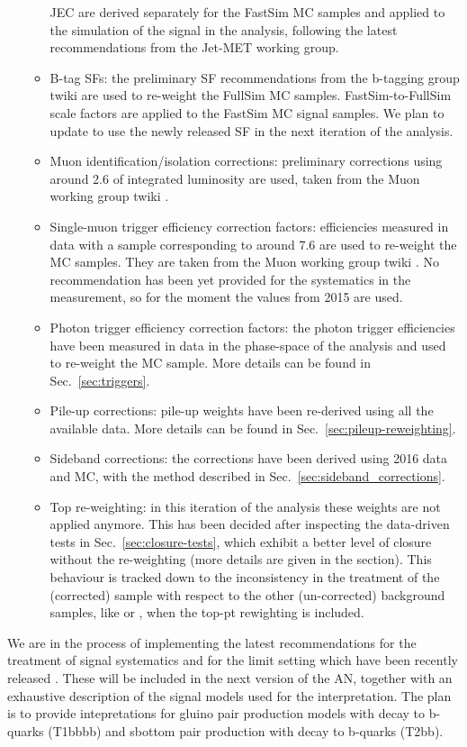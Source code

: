 \begin{itemize}
\begin{itemize}
    JEC are derived separately for the FastSim MC samples and applied to the simulation of the signal in the analysis, 
    following the latest recommendations from the Jet-MET working group. 
  \item B-tag SFs: the preliminary SF recommendations from the b-tagging group twiki \cite{btagSFMethods2016} are used to re-weight the FullSim MC samples. 
    FastSim-to-FullSim scale factors are applied to the FastSim MC signal samples. We plan to update to use the newly released SF in the next iteration of the analysis. 
  \item Muon identification/isolation corrections: preliminary corrections using around 2.6 \ifb of integrated luminosity are used, taken from the Muon working group twiki \cite{twiki-leptonSFMuonPOG2016}.
  \item Single-muon trigger efficiency correction factors: efficiencies measured in data with a sample corresponding to around 7.6 \ifb 
    are used to re-weight the MC samples. They are taken from the Muon working group twiki \cite{twiki-leptonSFMuonPOG2016}.
    No recommendation has been yet provided for the systematics in the measurement, so for the moment the values from 2015 are used. 
  \item Photon trigger efficiency correction factors: the photon trigger efficiencies have been measured in data in the phase-space 
    of the analysis and used to re-weight the \gj 
    MC sample. More details can be found in Sec.~\ref{sec:triggers}. 
  \item Pile-up corrections: pile-up weights have been re-derived using all the available data. 
    More details can be found in Sec.~\ref{sec:pileup-reweighting}. 
  \item Sideband corrections: the corrections have been derived using 2016 data and MC, with the method described 
    in Sec.~\ref{sec:sideband_corrections}. 
  \item Top \Pt re-weighting: in this iteration of the analysis these weights are not applied anymore. 
    This has been decided after inspecting the data-driven tests in Sec.~\ref{sec:closure-tests}, 
    which exhibit a better level of closure without the re-weighting (more details are given in the section). 
    This behaviour is tracked down to the inconsistency in the treatment of the (corrected) \ttj sample with respect to 
    the other (un-corrected) background samples, like \wj or \zj, when the top-pt rewighting is included. 
  \end{itemize}
\end{itemize}

We are in the process of implementing the latest recommendations for the treatment of signal systematics 
and for the limit setting which have been recently released \cite{twiki-SUSYICHEP16}. 
These will be included in the next version of the AN, together with an exhaustive description 
of the signal models used for the interpretation. 
The plan is to provide intepretations for gluino pair production models with decay to 
b-quarks (T1bbbb) and sbottom pair production with decay to b-quarks (T2bb).



